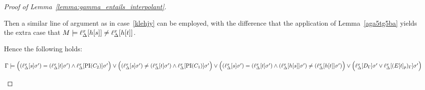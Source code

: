 \begin{proof}[Proof of Lemma~\ref{lemma:gamma_entails_interpolant}]
\begin{description}
\begin{enumerate}
				Then a similar line of argument as in case~\ref{klehjy} can be employed, with the difference that the application of Lemma~\ref{aga5tg5ba} yields the extra case that 
			$M\models \ell_{\Delta}^{x}[h[s]] \neq \ell_{\Delta}^{x}[h[t]]$.
				\begin{comment}
				\newenvironment{lemmaCustomNo}[1]
				{\renewcommand{\thelemma}{\ref{#1}$'$}%
					\addtocounter{lemma}{-1}%
				\begin{lemma}}
				{\end{lemma}}


				Then we have to replace Lemma \ref{aga5tg5ba} by:
				\bigskip

				\begin{lemmaCustomNo}{aga5tg5ba}
					$M \entails \lifdelta{s} = \lifdelta{t}$ and $M\notentails \lifdelta{E\occurat{t}{p}}\sigma'$ imply that $M\notentails \lifdelta{E\occurat{s}{p}}\sigma'$ or that $\lifdelta{h\occurat{s}{q}} \neq \lifdelta{h\occurat{t}{q}}$.
				\end{lemmaCustomNo}
				\begin{proof}
					If $\lifdelta{E\occurat{t}{p}}$ and $\lifdelta{E\occurat{s}{p}}$ differ only at position $p$, then the proof of Lemma \ref{aga5tg5ba} applies.
					
					Otherwise position $p$ is in a maximal $\Delta$-term $h\occurat{t}{q}$, such that $h\occurat{t}{q}$ and $h\occurat{s}{q}$ are replaced with distinct variables.
					But then clearly $\lifdelta{h\occurat{s}{q}} \neq \lifdelta{h\occurat{t}{q}}$.
				\end{proof}

				\end{comment}
 Hence the following holds:

				$\Gamma \models
				\Big((\ell_{\Delta}^{x}[s]\sigma')=(\ell_{\Delta}^{x}[t]\sigma') \land \ell_{\Delta}^{x}[\operatorname{PI}(C_2)]\sigma'\Big) \lor
				\Big((\ell_{\Delta}^{x}[s]\sigma')\neq(\ell_{\Delta}^{x}[t]\sigma') \land \ell_{\Delta}^{x}[\operatorname{PI}(C_1)]\sigma'\Big) \lor
				\Big((\ell_{\Delta}^{x}[s]\sigma')=(\ell_{\Delta}^{x}[t]\sigma') \land (\ell_{\Delta}^{x}[h[s]]\sigma') \neq (\ell_{\Delta}^{x}[h[t]]\sigma' )\Big) \lor
				\Big(\ell_{\Delta}^{x}[D_\Gamma]\sigma' \lor \ell_{\Delta}^{x}[(E{[t]_{p}})_\Gamma]\sigma'\Big)$
				\qedhere
		\end{enumerate}


		\begin{comment}



			easy case:
			$\PI(C) = [ ( s=t \land \PI(C_2) ) \lor (s\neq t \land \PI(C_1)) ]\sigma$


\end{comment}
\end{description}
\end{proof}

